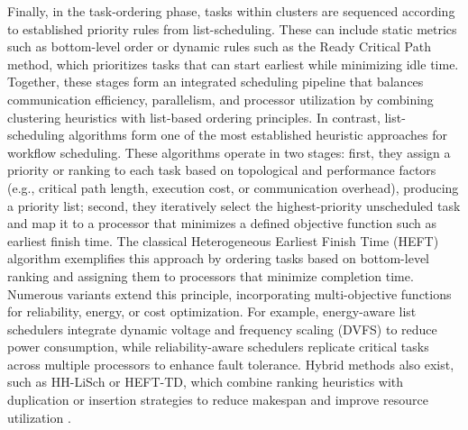 Finally, in the task-ordering phase, tasks within clusters are sequenced according to established priority rules from list-scheduling. These can include static metrics such as bottom-level order or dynamic rules such as the Ready Critical Path method, which prioritizes tasks that can start earliest while minimizing idle time. Together, these stages form an integrated scheduling pipeline that balances communication efficiency, parallelism, and processor utilization by combining clustering heuristics with list-based ordering principles.
In contrast, list-scheduling algorithms form one of the most established heuristic approaches for workflow scheduling. These algorithms operate in two stages: first, they assign a priority or ranking to each task based on topological and performance factors (e.g., critical path length, execution cost, or communication overhead), producing a priority list; second, they iteratively select the highest-priority unscheduled task and map it to a processor that minimizes a defined objective function such as earliest finish time. The classical Heterogeneous Earliest Finish Time (HEFT) algorithm exemplifies this approach by ordering tasks based on bottom-level ranking and assigning them to processors that minimize completion time. Numerous variants extend this principle, incorporating multi-objective functions for reliability, energy, or cost optimization. For example, energy-aware list schedulers integrate dynamic voltage and frequency scaling (DVFS) to reduce power consumption, while reliability-aware schedulers replicate critical tasks across multiple processors to enhance fault tolerance. Hybrid methods also exist, such as HH-LiSch or HEFT-TD, which combine ranking heuristics with duplication or insertion strategies to reduce makespan and improve resource utilization \cite{8301529}.



